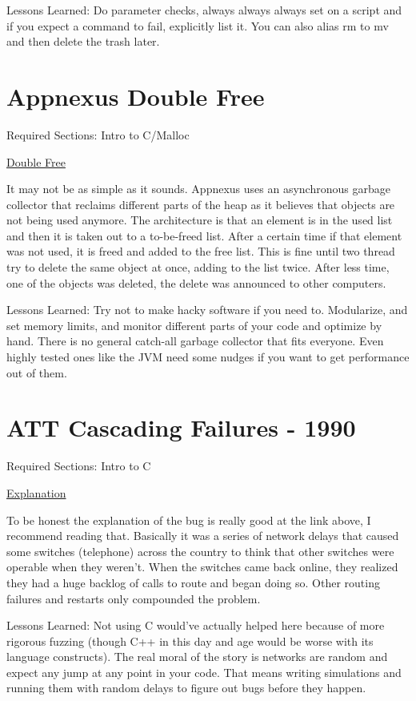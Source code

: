 Lessons Learned: Do parameter checks, always always always set  on a script and if you expect a command to fail, explicitly list it. You can also alias rm to mv and then delete the trash later.

\section{Appnexus Double Free}

Required Sections: Intro to C/Malloc

\href{https://techblog.appnexus.com/2013-09-17-outage-postmortem-586b19ae4307}{Double Free}

It may not be as simple as it sounds. Appnexus uses an asynchronous garbage collector that reclaims different parts of the heap as it believes that objects are not being used anymore. The architecture is that an element is in the used list and then it is taken out to a to-be-freed list. After a certain time if that element was not used, it is freed and added to the free list. This is fine until two thread try to delete the same object at once, adding to the list twice. After less time, one of the objects was deleted, the delete was announced to other computers.

Lessons Learned: Try not to make hacky software if you need to. Modularize, and set memory limits, and monitor different parts of your code and optimize by hand. There is no general catch-all garbage collector that fits everyone. Even highly tested ones like the JVM need some nudges if you want to get performance out of them.

\section{ATT Cascading Failures - 1990}

Required Sections: Intro to C

\href{http://users.csc.calpoly.edu/~jdalbey/SWE/Papers/att_collapse.html}{Explanation}

To be honest the explanation of the bug is really good at the link above, I recommend reading that. Basically it was a series of network delays that caused some switches (telephone) across the country to think that other switches were operable when they weren't. When the switches came back online, they realized they had a huge backlog of calls to route and began doing so. Other routing failures and restarts only compounded the problem.

Lessons Learned: Not using C would've actually helped here because of more rigorous fuzzing (though C++ in this day and age would be worse with its language constructs). The real moral of the story is networks are random and expect any jump at any point in your code. That means writing simulations and running them with random delays to figure out bugs before they happen.
